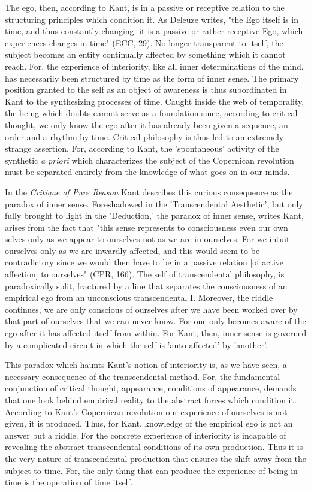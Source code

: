 The ego, then, according to Kant, is in a passive or receptive relation to the structuring principles which condition it. As Deleuze writes, "the Ego itself is in time, and thus constantly changing: it is a passive or rather receptive Ego, which experiences changes in time" (ECC, 29). No longer transparent to itself, the subject becomes an entity continually affected by something which it cannot reach. For, the experience of interiority, like all inner determinations of the mind, has necessarily been structured by time as the form of inner sense. The primary position granted to the self as an object of awareness is thus subordinated in Kant to the synthesizing processes of time. Caught inside the web of temporality, the being which doubts cannot serve as a foundation since, according to critical thought, we only know the ego after it has already been given a sequence, an order and a rhythm by time. Critical philosophy is thus led to an extremely strange assertion. For, according to Kant, the 'spontaneous' activity of the synthetic \textit{a priori} which characterizes the subject of the Copernican revolution must be separated entirely from the knowledge of what goes on in our minds.

In the \textit{Critique of Pure Reason} Kant describes this curious consequence as the paradox of inner sense. Foreshadowed in the 'Transcendental Aesthetic', but only fully brought to light in the 'Deduction,' the paradox of inner sense, writes Kant, arises from the fact that "this sense represents to consciousness even our own selves only as we appear to ourselves not as we are in ourselves. For we intuit ourselves only as we are inwardly affected, and this would seem to be contradictory since we would then have to be in a passive relation [of active affection] to ourselves" (CPR, 166). The self of transcendental philosophy, is paradoxically split, fractured by a line that separates the consciousness of an empirical ego from an unconscious transcendental I. Moreover, the riddle continues, we are only conscious of ourselves after we have been worked over by that part of ourselves that we can never know. For one only becomes aware of the ego after it has affected itself from within. For Kant, then, inner sense is governed by a complicated circuit in which the self is 'auto-affected' by 'another'.

This paradox which haunts Kant's notion of interiority is, as we have seen, a necessary consequence of the transcendental method. For, the fundamental conjunction of critical thought, appearance, conditions of appearance, demands that one look behind empirical reality to the abstract forces which condition it. According to Kant's Copernican revolution our experience of ourselves is not given, it is produced. Thus, for Kant, knowledge of the empirical ego is not an answer but a riddle. For the concrete experience of interiority is incapable of revealing the abstract transcendental conditions of its own production. Thus it is the very nature of transcendental production that ensures the shift away from the subject to time. For, the only thing that can produce the experience of being in time is the operation of time itself.

